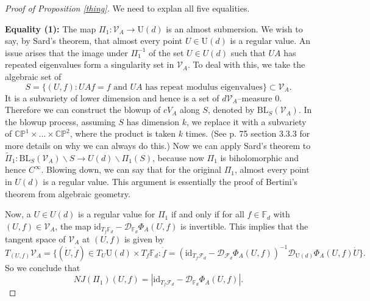\documentclass[10pt]{amsart}
\numberwithin{equation}{section}     %
\newcommand{\cD}{\mathcal{D}}\newcommand{\cE}{\mathcal{E}}\newcommand{\cF}{\mathcal{F}}
\newcommand{\cV}{\mathcal{V}}\newcommand{\cW}{\mathcal{W}}\newcommand{\cX}{\mathcal{X}}
\newcommand{\CP}{\mathbb{CP}}
\newcommand{\F}{\mathcal{F}}
\newcommand{\FF}{\mathbb{F}}
\newcommand{\U}{\mathrm{U}}
\renewcommand{\setminus}{\smallsetminus}
\begin{document}
\begin{proof}[Proof of Proposition \ref{thing}]
We need to explan all five equalities. 

\noindent \textbf{Equality (1):} The map $\Pi_1:\cV_A \to \U(d)$ is an almost submersion. We wish to say, by Sard's theorem, that almost every point $U \in \U(d)$ is a regular value. An issue arises that the image under $\Pi_1^{-1}$ of the set $U \in U(d)$ such that $UA$ has repeated eigenvalues form a singularity set in $\cV_A$. To deal with this, we take the algebraic set of $$S = \{ (U,f): UAf = f \text{ and } UA \text{ has repeat modulus eigenvalues}\} \subset \cV_A.$$ It is a subvariety of lower dimension and hence is a set of $d\cV_A$--measure $0$. Therefore we can construct the blowup of $cV_A$ along $S$, denoted by $\text{BL}_S(\cV_A)$. In the blowup process, assuming  $S$ has dimension $k$, we replace it with a subvariety of $\CP^1 \times ... \times \CP^2$, where the product is taken $k$ times. (See \cite{voisin2003hodge} p. 75 section 3.3.3 for more details on why we can always do this.) Now we can apply Sard's theorem to $\tilde{\Pi}_1:\text{BL}_S(\cV_A) \setminus  S \to U(d) \setminus \Pi_1(S)$, because now $\Pi_1$ is biholomorphic and hence $C^\infty$. Blowing down, we can say that for the original $\Pi_1$, almost every point in $U(d)$ is a regular value. This argument is essentially the proof of Bertini's theorem from algebraic geometry. 

Now, a $U \in U(d)$ is a regular value for $\Pi_1$ if and only if for all $f \in \FF_d$ with $(U,f) \in \cV_A$, the map $\mathrm{id}_{T_f\mathbb{F}_d} - \cD_{\FF_d} \Phi_A(U,f)$ is invertible. This implies that the tangent space of $\cV_A$ at $(U,f)$ is given by $$T_{(U,f)}\cV_A = \{(\dot{U}, \dot{f}) \in T_U \U(d) \times T_f \FF_d: \dot{f} = (\mathrm{id}_{T_f\F_d} - \cD_{\F_d}\Phi_A(U,f))^{-1} \cD_{\U(d)} \Phi_A (U,f) \dot{U} \}.$$ So we conclude that $$NJ(\Pi_1)(U,f) = |\mathrm{id}_{T_f\F_d} - \cD_{\FF_d}\Phi_A(U,f)|.$$


\end{proof}
\end{document}
